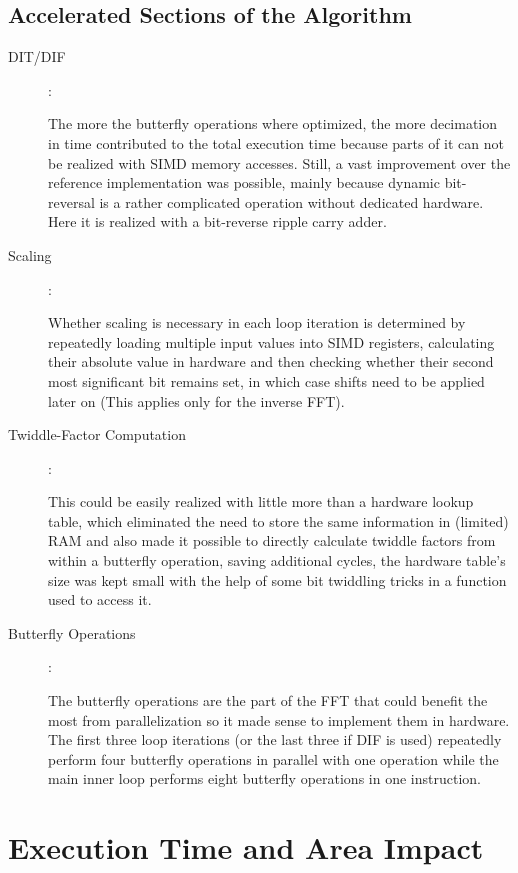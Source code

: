 \documentclass[ngerman, cd=lightcolor]{tudscrreprt}
\begin{document}
\section{Accelerated Sections of the Algorithm}

\begin{description}
\item[DIT/DIF]:

The more the butterfly operations where optimized, the more decimation in
time contributed to the total execution time because parts of it can not be
realized with SIMD memory accesses. Still, a vast improvement over the
reference implementation was possible, mainly because dynamic bit-reversal
is a rather complicated operation without dedicated hardware. Here it is
realized with a bit-reverse ripple carry adder.

\item[Scaling]:

Whether scaling is necessary in each loop iteration is determined by
repeatedly loading multiple input values into SIMD registers, calculating
their absolute value in hardware and then checking whether their second
most significant bit remains set, in which case shifts need to be applied later
on (This applies only for the inverse FFT).

\item[Twiddle-Factor Computation]:

This could be easily realized with little more than a hardware lookup table,
which eliminated the need to store the same information in (limited) RAM and
also made it possible to directly calculate twiddle factors from within a
butterfly operation, saving additional cycles, the hardware table’s size was
kept small with the help of some bit twiddling tricks in a function used to
access it.

\item[Butterfly Operations]:

The butterfly operations are the part of the FFT that could benefit the most
from parallelization so it made sense to implement them in hardware. The first
three loop iterations (or the last three if DIF is used) repeatedly perform
four butterfly operations in parallel with one operation while the main inner
loop performs eight butterfly operations in one instruction.
\end{description}

\chapter{Execution Time and Area Impact}
\end{document}
